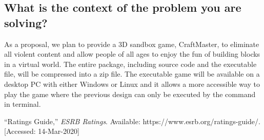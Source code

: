 \documentclass{article} %
\begin{document}
\subsection{What is the context of the problem you are solving?}

As a proposal, we plan to provide a 3D sandbox game, CraftMaster, to eliminate all violent content and allow people of all ages to enjoy the fun of building blocks in a virtual world. The entire package, including source code and the executable file, will be compressed into a zip file. The executable game will be available on a desktop PC with either Windows or Linux and it allows a more accessible way to play the game where the previous design can only be executed by the command in terminal.



\newpage
\begin{thebibliography}{9}
“Ratings Guide,” 
\textit{ESRB Ratings}. 
Available: https://www.esrb.org/ratings-guide/. [Accessed: 14-Mar-2020]
\end{thebibliography}




\end{document}
